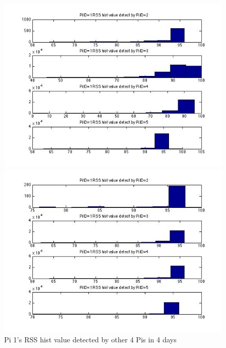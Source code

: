 \documentclass[10pt,conference]{IEEEtran}
\begin{document}
\begin{figure}[htbp]
\begin{minipage}[t]{0.2\textwidth}
\end{minipage}
\begin{minipage}[t]{0.2\textwidth}
	\centering
	\includegraphics[scale=0.2]{location0-3}
\end{minipage}
\begin{minipage}[t]{0.2\textwidth}
	\centering
	\includegraphics[scale=0.2]{location0-4}
\end{minipage}
\caption{Pi 1's RSS hist value detected by other 4 Pis in 4 days}\label{hist6}
\end{figure}
\end{document}
